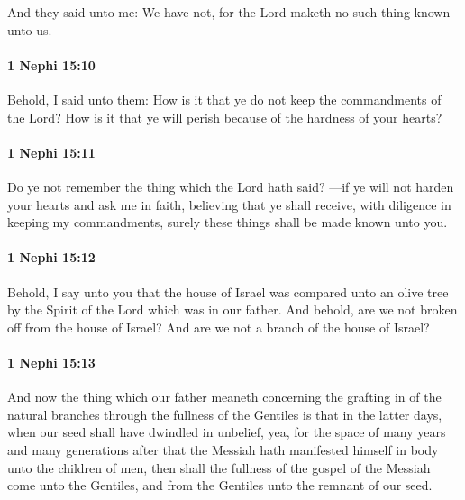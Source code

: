 			And they said unto me:
			We have not,
			for the Lord maketh no such thing known unto us.

		\paragraph{1 Nephi 15:10} %
			\label{1NEPHI-15-10}

			Behold, I said unto them:
			How is it that ye do not keep the commandments of the Lord?
			How is it that ye will perish because of the hardness of your hearts?

		\paragraph{1 Nephi 15:11} %
			\label{1NEPHI-15-11}

			Do ye not remember the thing which the Lord hath said?
			---if ye will not harden your hearts and ask me in faith,
			believing that ye shall receive,
			with diligence in keeping my commandments,
			surely these things shall be made known unto you.

		\paragraph{1 Nephi 15:12} %
			\label{1NEPHI-15-12}

			Behold, I say unto you that the house of Israel was compared unto an olive tree
			by the Spirit of the Lord which was in our father.
			And behold, are we not broken off from the house of Israel?
			And are we not a branch of the house of Israel?

		\paragraph{1 Nephi 15:13} %
			\label{1NEPHI-15-13}

			And now the thing which our father meaneth
			concerning the grafting in of the natural branches
			through the fullness of the Gentiles
			is that in the latter days, when our seed shall have dwindled in unbelief,
			yea, for the space of many years and many generations
			after that the Messiah hath manifested himself in body unto the children of men,
			then shall the fullness of the gospel of the Messiah come unto the Gentiles,
			and from the Gentiles unto the remnant of our seed.


